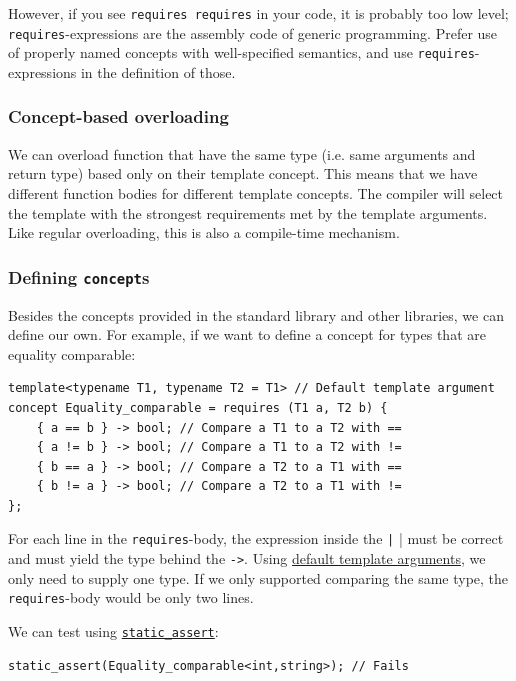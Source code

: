 \documentclass[table, xcdraw]{article}%
\begin{document}
However, if you see \texttt{requires requires} in your code, it is probably too low level; \texttt{requires}-expressions are the assembly code of generic programming. Prefer use of properly named concepts with well-specified semantics, and use \texttt{requires}-expressions in the definition of those.

\subsubsection{Concept-based overloading}

We can overload function that have the same type (i.e. same arguments and return type) based only on their template concept. This means that we have different function bodies for different template concepts. The compiler will select the template with the strongest requirements met by the template arguments. Like regular overloading, this is also a compile-time mechanism.

\subsubsection{Defining \texttt{concept}s}

Besides the concepts provided in the standard library and other libraries, we can define our own. For example, if we want to define a concept for types that are equality comparable:

\begin{verbatim}
template<typename T1, typename T2 = T1> // Default template argument
concept Equality_comparable = requires (T1 a, T2 b) {
    { a == b } -> bool; // Compare a T1 to a T2 with ==
    { a != b } -> bool; // Compare a T1 to a T2 with !=
    { b == a } -> bool; // Compare a T2 to a T1 with ==
    { b != a } -> bool; // Compare a T2 to a T1 with !=
};
\end{verbatim}

For each line in the  \texttt{requires}-body, the expression inside the \texttt|{ }| must be correct and must yield the type behind the \texttt{->}. Using \hyperref[default_template_arguments]{default template arguments}, we only need to supply one type. If we only supported comparing the same type, the \texttt{requires}-body would be only two lines.

We can test using \hyperref[static_assert]{\texttt{static_assert}}:

\begin{verbatim}
static_assert(Equality_comparable<int,string>); // Fails
\end{verbatim}
\end{document}
